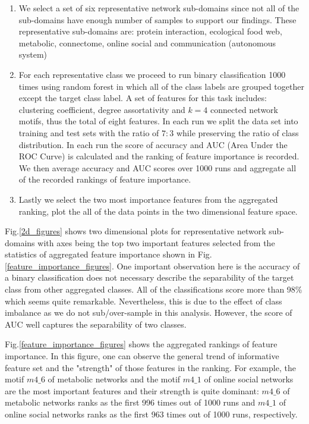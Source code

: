 \documentclass{article}
\begin{document}
\begin{enumerate}
	\item We select a set of six representative network sub-domains since not all of the sub-domains have enough number of samples to support our findings. These representative sub-domains are: protein interaction, ecological food web, metabolic, connectome,  online social and communication (autonomous system)
	\item For each representative class we proceed to run binary classification 1000 times using random forest in which all of the class labels are grouped together except the target class label. A set of features for this task includes: clustering coefficient, degree assortativity and $k = 4$ connected network motifs, thus the total of eight features. In each run we split the data set into training and test sets with the ratio of $7:3$ while preserving the ratio of class distribution. In each run the score of accuracy and AUC (Area Under the ROC Curve) is calculated and the ranking of feature importance is recorded. We then average accuracy and AUC scores over 1000 runs and aggregate all of the recorded rankings of feature importance.
	\item Lastly we select the two most importance features from the aggregated ranking, plot the all of the data points in the two dimensional feature space.
\end{enumerate}

Fig.\ref{2d_figures} shows two dimensional plots for representative network sub-domains with axes being the top two important features selected from the statistics of aggregated feature importance shown in Fig. \ref{feature_importance_figures}. One important observation here is the accuracy of a binary classification does not necessary describe the separability of the target class from other aggregated classes. All of the classifications score more than 98\% which seems quite remarkable. Nevertheless, this is due to the effect of class imbalance as we do not sub/over-sample in this analysis. However, the score of AUC well captures the separability of two classes. 

Fig.\ref{feature_importance_figures} shows the aggregated rankings of feature importance. In this figure, one can observe the general trend of informative feature set and the "strength" of those features in the ranking. For example, the motif $m4\_6$ of metabolic networks and the motif $m4\_1$ of online social networks are the most important features and their strength is quite dominant:  $m4\_6$ of metabolic networks ranks as the first 996 times out of 1000 runs and $m4\_1$ of online social networks ranks as the first 963 times  out of 1000 runs, respectively.
\end{document}
